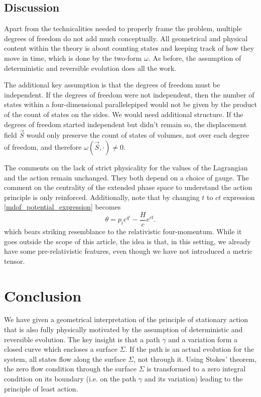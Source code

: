 \documentclass[10pt,twocolumn, nofootinbib]{revtex4-2}
\begin{document}
\subsection{Discussion}

Apart from the technicalities needed to properly frame the problem, multiple degrees of freedom do not add much conceptually. All geometrical and physical content within the theory is about counting states and keeping track of how they move in time, which is done by the two-form $\omega$. As before, the assumption of deterministic and reversible evolution does all the work.

The additional key assumption is that the degrees of freedom must be independent. If the degrees of freedom were not independent, then the number of states within a four-dimensional parallelepiped would not be given by the product of the count of states on the sides. We would need additional structure. If the degrees of freedom started independent but didn't remain so, the displacement field $\vec{S}$ would only preserve the count of states of volumes, not over each degree of freedom, and therefore $\omega(\vec{S}, \cdot) \neq 0$.

The comments on the lack of strict physicality for the values of the Lagrangian and the action remain unchanged. They both depend on a choice of gauge. The comment on the centrality of the extended phase space to understand the action principle is only reinforced. Additionally, note that by changing $t$ to $ct$ expression \ref{mdof_potential_expression} becomes
\begin{equation}\label{mdof_potential_relativistic}
	\theta = p_i e^{q^i} - \frac{H}{c} e^{ct}.
\end{equation}
which bears striking resemblance to the relativistic four-momentum. While it goes outside the scope of this article, the idea is that, in this setting, we already have some pre-relativistic features, even though we have not introduced a metric tensor.

\section{Conclusion}

We have given a geometrical interpretation of the principle of stationary action that is also fully physically motivated by the assumption of deterministic and reversible evolution. The key insight is that a path $\gamma$ and a variation form a closed curve which encloses a surface $\Sigma$. If the path is an actual evolution for the system, all states flow along the surface $\Sigma$, not through it. Using Stokes' theorem, the zero flow condition through the surface $\Sigma$ is transformed to a zero integral condition on its boundary (i.e. on the path $\gamma$ and its variation) leading to the principle of least action.
\end{document}
